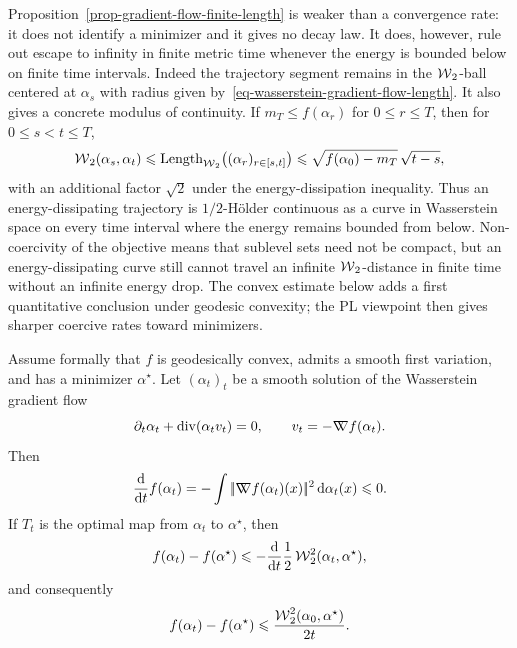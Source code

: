 Proposition~\ref{prop-gradient-flow-finite-length} is weaker than a convergence rate: it does not identify a minimizer and it gives no decay law. It does, however, rule out escape to infinity in finite metric time whenever the energy is bounded below on finite time intervals. Indeed the trajectory segment remains in the \(\operatorname{\mathcal{W}}_2\)-ball centered at \(\alpha_s\) with radius given by~\eqref{eq-wasserstein-gradient-flow-length}. It also gives a concrete modulus of continuity. If \(m_T\leq f(\alpha_r)\) for \(0\leq r\leq T\), then for \(0\leq s<t\leq T\),
\[
	\operatorname{\mathcal{W}}_2(\alpha_s,\alpha_t)
	\leqslant
	\operatorname{Length}_{\operatorname{\mathcal{W}}_2}\bigl((\alpha_r)_{r\in[s,t]}\bigr)
	\leqslant
	\sqrt{f(\alpha_0)-m_T}\,\sqrt{t-s},
\]
with an additional factor \(\sqrt2\) under the energy-dissipation inequality. Thus an energy-dissipating trajectory is \(1/2\)-H\"older continuous as a curve in Wasserstein space on every time interval where the energy remains bounded from below. Non-coercivity of the objective means that sublevel sets need not be compact, but an energy-dissipating curve still cannot travel an infinite \(\operatorname{\mathcal{W}}_2\)-distance in finite time without an infinite energy drop. The convex estimate below adds a first quantitative conclusion under geodesic convexity; the PL viewpoint then gives sharper coercive rates toward minimizers.

\begin{prop}\label{prop-convex-wass-flow-rate}
	Assume formally that \(f\) is geodesically convex, admits a smooth first variation, and has a minimizer \(\alpha^\star\). Let \((\alpha_t)_t\) be a smooth solution of the Wasserstein gradient flow
	\[
		\partial_t\alpha_t+\operatorname{div}(\alpha_t v_t)=0,
		\qquad
		v_t=-\mathord{\nabla\mkern-9.3mu\nabla} f(\alpha_t).
	\]
	Then
	\[
		\frac{\mathrm{d}}{\mathrm{d} t} f(\alpha_t)
		=
		-\int |\!| \mathord{\nabla\mkern-9.3mu\nabla} f(\alpha_t)(x) |\!|^2\,\mathrm{d}\alpha_t(x)
		\leqslant 0.
	\]
	If \(T_t\) is the optimal map from \(\alpha_t\) to \(\alpha^\star\), then
	\[
		f(\alpha_t)-f(\alpha^\star)
		\leqslant
		-\frac{\mathrm{d}}{\mathrm{d} t}\frac12 \operatorname{\mathcal{W}}_2^2(\alpha_t,\alpha^\star),
	\]
	and consequently
	\[
		f(\alpha_t)-f(\alpha^\star)
		\leqslant
		\frac{\operatorname{\mathcal{W}}_2^2(\alpha_0,\alpha^\star)}{2t}.
	\]
\end{prop}

